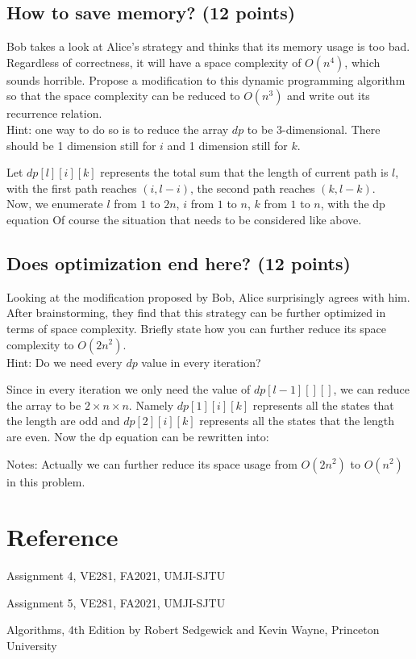 \documentclass[11pt]{exam}
\begin{document}
\subsection{How to save memory? (12 points)}
Bob takes a look at Alice's strategy and thinks that its memory usage is too bad. Regardless of correctness, it will have a space complexity of $O(n^4)$, which sounds horrible. Propose a modification to this dynamic programming algorithm so that the space complexity can be reduced to $O(n^3)$ and write out its recurrence relation.\\
Hint: one way to do so is to reduce the array $dp$ to be 3-dimensional. There should be 1 dimension still for $i$ and 1 dimension still for $k$.
\begin{solution}
Let $dp[l][i][k]$ represents the total sum that the length of current path is $l$, with the 
first path reaches $(i,l-i)$, the second path reaches $(k,l-k)$.\\
Now, we enumerate $l$ from $1$ to $2n$, $i$ from $1$ to $n$, $k$ from $1$ to $n$, with the dp equation
Of course the situation that  needs to be considered like above.
\end{solution}
\subsection{Does optimization end here? (12 points)}
Looking at the modification proposed by Bob, Alice surprisingly agrees with him. After brainstorming, they find that this strategy can be further optimized in terms of space complexity. Briefly state how you can further reduce its space complexity to $O(2n^2)$.\\
Hint: Do we need every $dp$ value in every iteration?
\begin{solution}
Since in every iteration we only need the value of $dp[l-1][][]$, we can reduce the array to be $2\times n\times n$.
Namely $dp[1][i][k]$ represents all the states that the length are odd and $dp[2][i][k]$ represents
all the states that the length are even. Now the dp equation can be rewritten into:\\
\end{solution}
Notes: Actually we can further reduce its space usage from $O(2n^2)$ to $O(n^2)$ in this problem.
\newpage

\section*{Reference}
Assignment 4, VE281, FA2021, UMJI-SJTU

Assignment 5, VE281, FA2021, UMJI-SJTU

Algorithms, 4th Edition by Robert Sedgewick and Kevin Wayne, Princeton University
\end{document}

